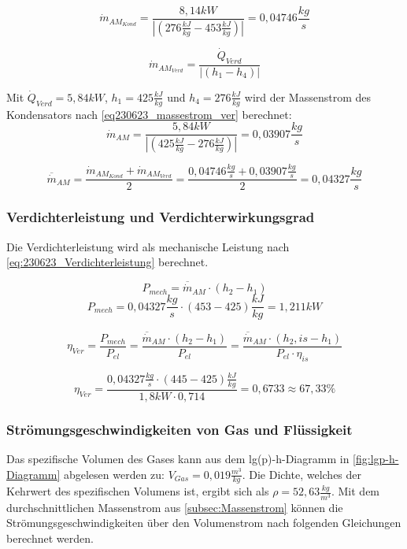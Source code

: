 $$ \dot m_{AM_{Kond}} = \frac{8,14kW}{|(276\frac{kJ}{kg} - 453\frac{kJ}{kg})|} = 0,04746 \frac{kg}{s} $$

\begin{equation}
  \dot m_{AM_{Verd}} = \frac{\dot Q_{Verd}}{|(h_1-h_4)|}
    \label{eq230623_massestrom_ver}
\end{equation}

Mit $\dot Q_{Verd}=5,84kW$, $h_1=425\frac{kJ}{kg}$ und $h_4=276\frac{kJ}{kg}$ wird der Massenstrom des Kondensators nach \autoref*{eq230623_massestrom_ver} berechnet:
$$\dot m_{AM} = \frac{5,84 kW}{|(425\frac{kJ}{kg}-276\frac{kJ}{kg})|} = 0,03907 \frac{kg}{s}$$

$$\overline{\dot m}_{AM} = \frac{\dot m_{AM_{Kond}}+\dot m_{AM_{Verd}}}{2} = \frac{0,04746 \frac{kg}{s}+0,03907 \frac{kg}{s}}{2} = 0,04327 \frac{kg}{s} $$



\subsubsection{Verdichterleistung und Verdichterwirkungsgrad}

Die Verdichterleistung wird als mechanische Leistung nach \autoref{eq:230623_Verdichterleistung} berechnet.

\begin{equation}
    P_{mech} = \overline{\dot m}_{AM} \cdot (h_2-h_1)
\label{eq:230623_Verdichterleistung}
\end{equation}
$$  P_{mech} = 0,04327 \frac{kg}{s} \cdot (453-425)\frac{kJ}{kg} = 1,211 kW $$

\begin{equation}
  \eta_{Ver} = \frac{P_{mech}}{P_{el}}=\frac{\overline{\dot m}_{AM}\cdot (h_2-h_1)}{P_{el}}=\frac{\overline{\dot m}_{AM}\cdot (h_2,is-h_1)}{P_{el}\cdot \eta_{is}}
\label{eq:230623_Verdichterwirkungsgrad}
\end{equation}

$$\eta_{Ver} = \frac{0,04327 \frac{kg}{s}\cdot (445-425)\frac{kJ}{kg}}{1,8 kW \cdot 0,714}= 0,6733 \approx 67,33 \% $$

\subsubsection{Strömungsgeschwindigkeiten von Gas und Flüssigkeit}

Das spezifische Volumen des Gases kann aus dem lg(p)-h-Diagramm in \autoref{fig:lgp-h-Diagramm} abgelesen werden zu: $V_{Gas}=0,019 \frac{m^3}{kg}$. Die Dichte, welches der Kehrwert des spezifischen Volumens ist, ergibt sich als $\rho=52,63 \frac{kg}{m^3}$. 
Mit dem durchschnittlichen Massenstrom aus \autoref{subsec:Massenstrom} können die Strömungsgeschwindigkeiten über den Volumenstrom nach folgenden Gleichungen berechnet werden.

